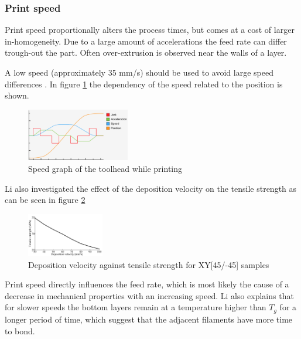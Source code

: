 \subsubsection {Print speed }
Print speed proportionally alters the process times,  but comes at a cost of larger in-homogeneity. Due to a large amount of accelerations the feed rate can differ trough-out the part. Often over-extrusion is observed near the walls of a layer.

A low speed (approximately 35 mm/s) should be used to avoid large speed differences \cite{Li2017TheProperties}.  In figure \ref{fig:speedgraph} the dependency of the speed related to the position is shown.

\begin{figure}[H]
    \centering
    \includegraphics[width=0.4\textwidth]{chapter_2/figures/Speedgraph.PNG}
    \caption{Speed graph of the toolhead while printing \cite{UltimakerSpeed}}
    \label{fig:speedgraph}
\end{figure}

Li \cite{Li2017TheProperties} also investigated the effect of the deposition velocity on the tensile strength as can be seen in figure \ref{fig:depositionspeed}

\begin{figure}[H]
    \centering
    \includegraphics[width=0.3\textwidth]{chapter_2/figures/depostionspeed.PNG}
    \caption{Deposition velocity against tensile strength for XY[45/-45] samples \cite{Li2017TheProperties}}
    \label{fig:depositionspeed}
\end{figure}

Print speed directly influences the feed rate, which is most likely the cause of a decrease in mechanical properties with an increasing speed. Li also explains that for slower speeds the bottom layers remain at a temperature higher than $T_g$ for a longer period of time, which suggest that the adjacent filaments have more time to bond.

